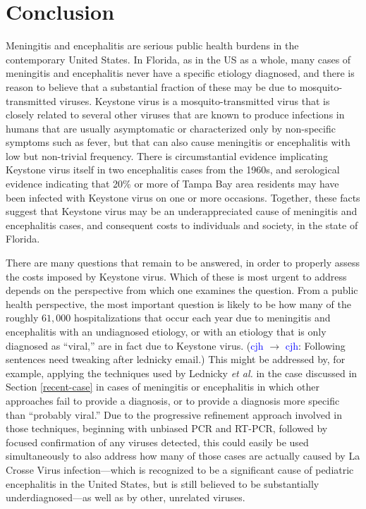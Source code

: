 \documentclass[12pt]{article}
\newcommand{\cjh}{\textcolor{blue}{cjh}}
\newcommand{\msg}[3]{(#1 $\rightarrow$ #2: #3)}
\newcommand{\mcc}[1]{\msg\cjh\cjh{#1}}
\begin{document}
    \section{Conclusion}
        \label{conclusion}
        Meningitis and encephalitis are serious public health burdens in the contemporary United States. In Florida, as in the US as a whole, many cases of meningitis and encephalitis never have a specific etiology diagnosed, and there is reason to believe that a substantial fraction of these may be due to mosquito-transmitted viruses. Keystone virus is a mosquito-transmitted virus that is closely related to several other viruses that are known to produce infections in humans that are usually asymptomatic or characterized only by non-specific symptoms such as fever, but that can also cause meningitis or encephalitis with low but non-trivial frequency. There is circumstantial evidence implicating Keystone virus itself in two encephalitis cases from the 1960s, and serological evidence indicating that 20\% or more of Tampa Bay area residents may have been infected with Keystone virus on one or more occasions. Together, these facts suggest that Keystone virus may be an underappreciated cause of meningitis and encephalitis cases, and consequent costs to individuals and society, in the state of Florida.


        There are many questions that remain to be answered, in order to properly assess the costs imposed by Keystone virus. Which of these is most urgent to address depends on the perspective from which one examines the question. From a public health perspective, the most important question is likely to be how many of the roughly $61,000$ hospitalizations that occur each year due to meningitis and encephalitis with an undiagnosed etiology\cite{holmquist2008meningitis,george2014encephalitis}, or with an etiology that is only diagnosed as ``viral,'' are in fact due to Keystone virus. \mcc{Following sentences need tweaking after lednicky email.} This might be addressed by, for example, applying the techniques used by Lednicky \textit{et al.}\cite{lednicky2018keystone} in the case discussed in Section \ref{recent-case} in cases of meningitis or encephalitis in which other approaches fail to provide a diagnosis, or to provide a diagnosis more specific than ``probably viral.'' Due to the progressive refinement approach involved in those techniques, beginning with unbiased PCR and RT-PCR, followed by focused confirmation of any viruses detected, this could easily be used simultaneously to also address how many of those cases are actually caused by La Crosse Virus infection---which is recognized to be a significant cause of pediatric encephalitis in the United States, but is still believed to be substantially underdiagnosed---as well as by other, unrelated viruses.
\end{document}
